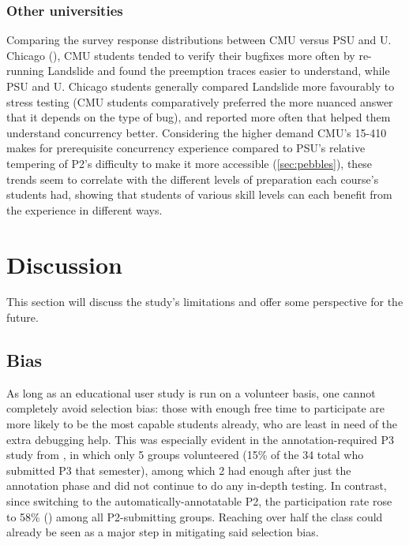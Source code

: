 \subsubsection{Other universities}

Comparing the survey response distributions between CMU versus PSU and U. Chicago (),
CMU students tended to verify their bugfixes more often by re-running Landslide
and found the preemption traces easier to understand,
while PSU and U. Chicago students generally compared Landslide more favourably to stress testing
(CMU students comparatively preferred the more nuanced answer that it depends on the type of bug),
and reported more often that  helped them understand concurrency better.
Considering the higher demand CMU's 15-410 makes for prerequisite concurrency experience
compared to PSU's relative tempering of P2's difficulty to make it more accessible (\cref{sec:pebbles}),
these trends seem to correlate with the different levels of preparation each course's students had,
showing that students of various skill levels
can each benefit from the experience in different ways.


\section{Discussion}
\label{sec:education-discussion}

This section will discuss the study's limitations and offer some perspective for the future.

\subsection{Bias}


As long as an educational user study is run on a volunteer basis,
one cannot completely avoid selection bias:
those with enough free time to participate are more likely to be the most capable students already,
who are least in need of the extra debugging help.
This was especially evident in the annotation-required P3 study from  \cite{landslide},
in which only 5 groups volunteered (15\% of the 34 total who submitted P3 that semester),
among which 2 had enough after just the annotation phase and did not continue to do any in-depth testing.
In contrast, since switching to the automatically-annotatable P2,
the participation rate rose to 58\% ()
among all P2-submitting groups.
Reaching over half the class could already be seen as a major step in mitigating said selection bias.


